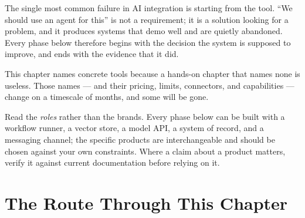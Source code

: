 \begin{engineernote}
The single most common failure in AI integration is starting from the tool.
``We should use an agent for this'' is not a requirement; it is a solution
looking for a problem, and it produces systems that demo well and are quietly
abandoned. Every phase below therefore begins with the decision the system is
supposed to improve, and ends with the evidence that it did.
\end{engineernote}

\begin{cautionbox}
This chapter names concrete tools because a hands-on chapter that names none
is useless. Those names --- and their pricing, limits, connectors, and
capabilities --- change on a timescale of months, and some will be gone.

Read the \emph{roles} rather than the brands. Every phase below can be built
with a workflow runner, a vector store, a model API, a system of record, and a
messaging channel; the specific products are interchangeable and should be
chosen against your own constraints. Where a claim about a product matters,
verify it against current documentation before relying on it.
\end{cautionbox}

\section{The Route Through This Chapter}

